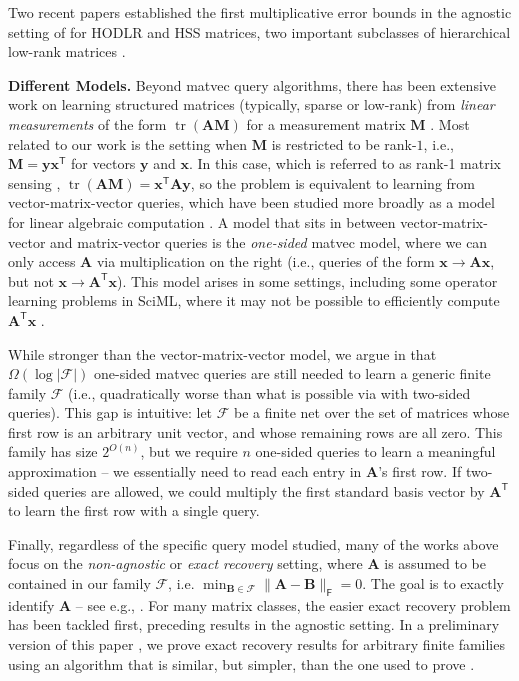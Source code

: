 \documentclass{article}[11pt]
\theoremstyle{definition}
\newcommand{\bv}[1]{\boldsymbol{\mathbf{#1}}}
\newcommand{\T}{\mathsf{T}}
\newcommand{\Fro}{\mathsf{F}}
\newcommand{\F}{\mathcal{F}}
\newcommand{\tr}{\operatorname{tr}}
\newcommand{\transpose}{\mathsf{T}}
\begin{document}
Two recent papers established the first multiplicative error bounds in the agnostic setting of  for HODLR and HSS matrices, two important subclasses of hierarchical low-rank matrices \cite{ChenHalikiasKeles:2025,AmselChenHalikias:2025}. 




\smallskip \noindent \textbf{Different Models.}
Beyond matvec query algorithms, there has been extensive work on learning structured matrices (typically, sparse or low-rank) from \emph{linear measurements} of the form $\tr(\bv{A}\bv{M})$ for a measurement matrix $\bv{M}$ \cite{WatersSankaranarayananBaraniuk:2011,CandesPlan:2011,KachamWoodruff:2023}. Most related to our work is the setting when $\bv{M}$ is restricted to be rank-$1$, i.e., $\bv{M} = \bv{y}\bv{x}^\T$ for vectors $\bv{y}$ and $\bv{x}$. In this case, which is referred to as rank-1 matrix sensing \cite{ZhongJainDhillon:2015}, $\tr(\bv{A}\bv{M}) = \bv{x}^\T\bv{A}\bv{y}$, so the problem is equivalent to learning from vector-matrix-vector queries, which have been studied more broadly as a model for linear algebraic computation \cite{RashtchianWoodruffZhu:2020,WimmerWuZhang:2014}. 
A model that sits in between vector-matrix-vector and matrix-vector queries is the \emph{one-sided} matvec model, where we can only access $\bv{A}$ via multiplication on the right (i.e., queries of the form $\bv{x}\rightarrow \bv{Ax}$, but not $\bv{x}\rightarrow \bv{A}^\transpose\bv{x}$). This model arises in some settings, including some operator learning problems in SciML, where it may not be possible to efficiently compute $\bv{A}^\transpose \bv{x}$ \cite{BoulleHalikiasOtto:2024}.

While stronger than the vector-matrix-vector model, we argue in  that $\Omega(\log |\F|)$ one-sided matvec queries are still needed to learn a generic finite family $\mathcal{F}$ (i.e., quadratically worse than what is possible via  with two-sided queries). This gap is intuitive: let $\F$ be a finite net over the set of matrices whose first row is an arbitrary unit vector, and whose remaining rows are all zero. This family has size $2^{O(n)}$, but we require $n$ one-sided queries to learn a meaningful approximation -- we essentially need to read each entry in $\bv{A}$'s first row. If two-sided queries are allowed, we could multiply the first standard basis vector by $\bv{A}^\transpose$ to learn the first row with a single query. 


Finally, regardless of the specific query model studied, many of the works above focus on the \emph{non-agnostic} or \emph{exact recovery} setting, where $\bv A$ is assumed to be contained in our family $\mathcal{F}$, i.e. $\min_{\bv{B}\in \mathcal{F}}\|\bv{A} - \bv{B}\|_\Fro = 0$. The goal is to exactly identify $\bv A$ -- see e.g., \cite{HalikiasTownsend:2023}. For many matrix classes, the easier exact recovery problem has been tackled first, preceding results in the agnostic setting. In a preliminary version of this paper \cite{AmselAviChenKelesHegdeMuscoMuscoPersson:2025}, we prove exact recovery results for arbitrary finite families using an algorithm that is similar, but simpler, than the one used to prove .
\end{document}
